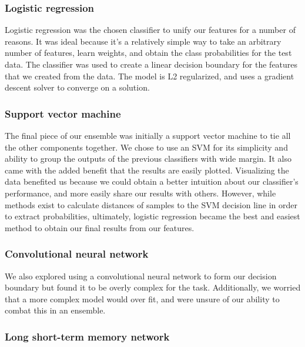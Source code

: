 \documentclass{article}
\begin{document}
\subsubsection{Logistic regression}

Logistic regression was the chosen classifier to unify our features for a number
of reasons. It was ideal because it's a relatively simple way to take an
arbitrary number of features, learn weights, and obtain the class probabilities
for the test data. The classifier was used to create a linear decision boundary
for the features that we created from the data. The model is L2 regularized, and
uses a gradient descent solver to converge on a solution.

\subsubsection{Support vector machine}

The final piece of our ensemble was initially a support vector machine to tie
all the other components together. We chose to use an SVM for its simplicity and
ability to group the outputs of the previous classifiers with wide margin. It
also came with the added benefit that the results are easily plotted. Visualizing the
data benefited us because we could obtain a better intuition about our
classifier's performance, and more easily share our results with others.
However, while methods exist to calculate distances of samples to the SVM
decision line in order to extract probabilities, ultimately, logistic regression
became the best and easiest method to obtain our final results from our
features.

\subsubsection{Convolutional neural network}

We also explored using a convolutional neural network to form our decision
boundary but found it to be overly complex for the task. Additionally, we
worried that a more complex model would over fit, and were unsure of our ability
to combat this in an ensemble.

\subsubsection{Long short-term memory network}
\end{document}
